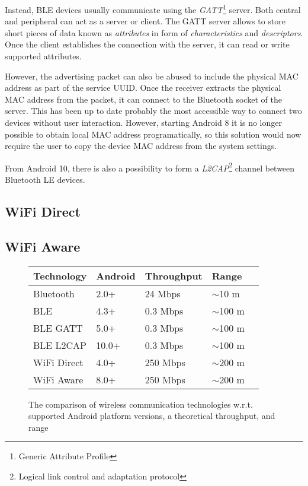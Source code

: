 \documentclass[conference,compsoc]{IEEEtran}
\begin{document}
Instead, BLE devices usually communicate using the \textit{GATT}\footnote{Generic Attribute Profile} server. Both central and peripheral can act as a server or client. The GATT server allows to store short pieces of data known as \textit{attributes} in form of \textit{characteristics} and \textit{descriptors}. Once the client establishes the connection with the server, it can read or write supported attributes.

However, the advertising packet can also be abused to include the physical MAC address as part of the service UUID. Once the receiver extracts the physical MAC address from the packet, it can connect to the Bluetooth socket of the server. This has been up to date probably the most accessible way to connect two devices without user interaction. However, starting Android 8 it is no longer possible to obtain local MAC address programatically, so this solution would now require the user to copy the device MAC address from the system settings.

From Android 10, there is also a possibility to form a \textit{L2CAP}\footnote{Logical link control and adaptation protocol} channel between Bluetooth LE devices.

\subsection{WiFi Direct}
\subsection{WiFi Aware}


\begin{figure}  
  \centering
  \begin{tabular}{ | l | l | l | l | l | }
    \hline
    Technology & Android & Throughput & Range \\
    \hline
    Bluetooth & 2.0+ & 24 Mbps & $\sim$10 m \\
    BLE & 4.3+ & 0.3 Mbps & $\sim$100 m \\
    BLE GATT & 5.0+ & 0.3 Mbps & $\sim$100 m \\
    BLE L2CAP & 10.0+ & 0.3 Mbps & $\sim$100 m \\
    WiFi Direct & 4.0+ & 250 Mbps & $\sim$200 m \\
    WiFi Aware & 8.0+ & 250 Mbps & $\sim$200 m \\
    \hline
  \end{tabular}
  \caption{The comparison of wireless communication technologies w.r.t. supported Android platform versions, a theoretical throughput, and range}
\end{figure}
\end{document}
